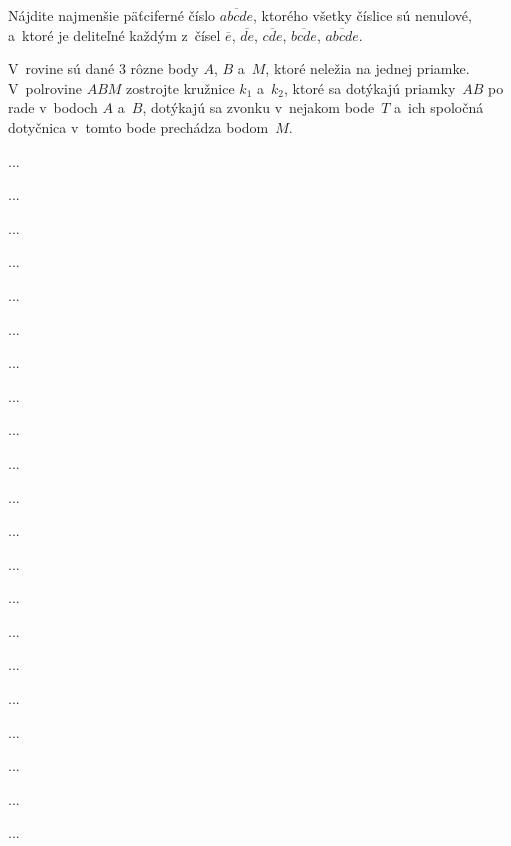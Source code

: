 {%
Nájdite najmenšie päťciferné číslo $\overline{abcde}$,
ktorého všetky číslice sú nenulové, a~ktoré je deliteľné každým
z~čísel  $\overline{e}$, $\overline{de}$, $\overline{cde}$,
$\overline{bcde}$, $\overline{abcde}$.}

{%
V~rovine sú dané 3 rôzne body $A$, $B$ a~$M$, ktoré neležia na jednej
priamke. V~polrovine $ABM$ zostrojte kružnice $k_1$
a~$k_2$, ktoré sa dotýkajú priamky~$AB$ po rade v~bodoch $A$ a~$B$,
dotýkajú sa zvonku v~nejakom bode~$T$ a~ich spoločná dotyčnica v~tomto bode
prechádza bodom~$M$.}

{%
...}

{%
...}

{%
...}

{%
...}

{%
...}

{%
...}

{%
...}

{%
...}

{%
...}

{%
...}

{%
...}

{%
...}

{%
...}

{%
...}

{%
...}

{%
...}

{%
...}

{%
...}

{%
...}

{%
...}

{%
...}

